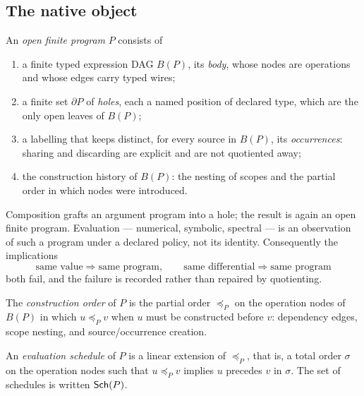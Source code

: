 
\subsection{The native object}

\begin{definition}\label{def:open-program}
An \emph{open finite program} $P$ consists of
\begin{enumerate}
\item a finite typed expression DAG $B(P)$, its \emph{body}, whose nodes are
  operations and whose edges carry typed wires;
\item a finite set $\partial P$ of \emph{holes}, each a named position of declared
  type, which are the only open leaves of $B(P)$;
\item a labelling that keeps distinct, for every source in $B(P)$, its
  \emph{occurrences}: sharing and discarding are explicit and are not quotiented
  away;
\item the construction history of $B(P)$: the nesting of scopes and the partial
  order in which nodes were introduced.
\end{enumerate}
\end{definition}

Composition grafts an argument program into a hole; the result is again an open
finite program.  Evaluation --- numerical, symbolic, spectral --- is an observation
of such a program under a declared policy, not its identity.  Consequently the
implications
\[
\text{same value}\Rightarrow\text{same program},\qquad
\text{same differential}\Rightarrow\text{same program}
\]
both fail, and the failure is recorded rather than repaired by quotienting.

\begin{definition}\label{def:construction-order}
The \emph{construction order} of $P$ is the partial order $\preceq_P$ on the
operation nodes of $B(P)$ in which $u\preceq_P v$ when $u$ must be constructed
before $v$: dependency edges, scope nesting, and source/occurrence creation.
\end{definition}

\begin{definition}\label{def:schedule}
An \emph{evaluation schedule} of $P$ is a linear extension of $\preceq_P$, that is,
a total order $\sigma$ on the operation nodes such that $u\preceq_P v$ implies
$u$ precedes $v$ in $\sigma$.  The set of schedules is written $\mathsf{Sch}(P)$.
\end{definition}

